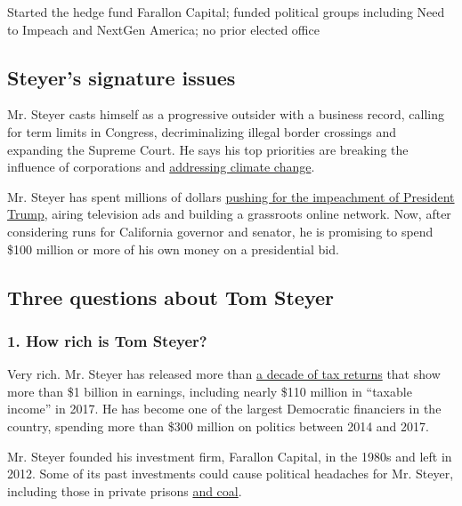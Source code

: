 Started the hedge fund Farallon Capital; funded political groups
including Need to Impeach and NextGen America; no prior elected office

\hypertarget{steyers-signature-issues}{%
\subsection{Steyer's signature issues}\label{steyers-signature-issues}}

Mr. Steyer casts himself as a progressive outsider with a business
record, calling for term limits in Congress, decriminalizing illegal
border crossings and expanding the Supreme Court. He says his top
priorities are breaking the influence of corporations and
\href{https://www.nytimes.com/2014/05/22/us/politics/tom-steyer-hopes-nextgen-climate-gets-voters-to-consider-environment.html}{addressing
climate change}.

Mr. Steyer has spent millions of dollars
\href{https://www.nytimes.com/2018/01/23/us/politics/impeach-trump-democrats-tom-steyer.html}{pushing
for the impeachment of President Trump}, airing television ads and
building a grassroots online network. Now, after considering runs for
California governor and senator, he is promising to spend \$100 million
or more of his own money on a presidential bid.

\hypertarget{three-questions-about-tom-steyer}{%
\subsection{Three questions about Tom
Steyer}\label{three-questions-about-tom-steyer}}

\hypertarget{1-how-rich-is-tom-steyer}{%
\subsubsection{\texorpdfstring{\textbf{1. How rich is Tom
Steyer?}}{1. How rich is Tom Steyer?}}\label{1-how-rich-is-tom-steyer}}

Very rich. Mr. Steyer has released more than
\href{https://www.tomsteyer.com/transparency/}{a decade of tax returns}
that show more than \$1 billion in earnings, including nearly \$110
million in ``taxable income'' in 2017. He has become one of the largest
Democratic financiers in the country, spending more than \$300 million
on politics between 2014 and 2017.

Mr. Steyer founded his investment firm, Farallon Capital, in the 1980s
and left in 2012. Some of its past investments could cause political
headaches for Mr. Steyer, including those in private prisons
\href{https://www.nytimes.com/2014/07/05/us/politics/prominent-environmentalist-helped-fund-coal-projects.html}{and
coal}.

